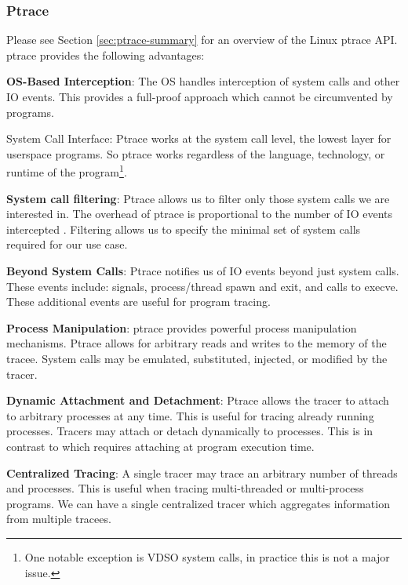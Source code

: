 \subsubsection{Ptrace} \label{sec:ptrace-tradeoffs}
Please see Section \ref{sec:ptrace-summary} for an overview of the Linux ptrace API. ptrace provides the following advantages:
\begin{compactitem}
    \item \textbf{OS-Based Interception}: The OS handles interception of system calls and other IO events. This provides a full-proof approach which cannot be circumvented by programs.
    \item System Call Interface: Ptrace works at the system call level, the lowest layer
    for userspace programs. So ptrace works regardless of the language, technology, or runtime of the program\footnote{One notable exception is VDSO system calls, in practice this is not a major issue.}.
   \item \textbf{System call filtering}: Ptrace allows us to filter only those system calls we are interested in. The overhead of ptrace is proportional to the number of IO events intercepted \cite{dettrace}. Filtering allows us to specify the minimal set of system calls required for our use case. 
    \item \textbf{Beyond System Calls}: Ptrace notifies us of IO events beyond just system calls. These events include: signals, process/thread spawn and exit, and calls to execve. These additional events are useful for program tracing.
    \item \textbf{Process Manipulation}: ptrace provides powerful process manipulation mechanisms. Ptrace allows for arbitrary reads and writes to the memory of the tracee. System calls may be emulated, substituted, injected, or modified by the tracer.
    \item \textbf{Dynamic Attachment and Detachment}: Ptrace allows the tracer to attach to arbitrary processes at any time. This is useful for tracing already running processes. Tracers may attach or detach dynamically to processes. This is in contrast to \ldpreload{} which requires attaching at program execution time.
    \item \textbf{Centralized Tracing}: A single tracer may trace an arbitrary number of threads and processes. This is useful when tracing multi-threaded or multi-process programs. We can have a single centralized tracer which aggregates information from multiple tracees.
\end{compactitem}

